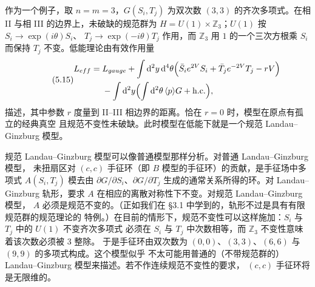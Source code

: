 作为一个例子，取 $n=m=3$，$G(S_i,T_j)$ 为双次数 $(3,3)$ 的齐次多项式。在相 II 与相 III
的边界上，未破缺的规范群为 $H=U(1)\times\mathbb{Z}_3$；$U(1)$ 按 $S_i\to\exp(i\theta)S_i$、
$T_j\to\exp(-i\theta)T_j$ 作用，而 $\mathbb{Z}_3$ 用 $1$ 的一个三次方根乘 $S_i$ 而保持 $T_j$
不变。低能理论由有效作用量
\begin{equation}
\tag{5.15}
\begin{aligned}
L_{eff}={}&L_{gauge}+\int\mathrm{d}^2y\,\mathrm{d}^4\theta
\Bigl(\bar S_ie^{2V}S_i+\bar T_je^{-2V}T_j-rV\Bigr)\\
&-\int\mathrm{d}^2y\Bigl(\int\mathrm{d}^2\theta\,\langle p\rangle G+\mathrm{h.c.}\Bigr),
\end{aligned}
\end{equation}
描述，其中参数 $r$ 度量到 II--III 相边界的距离。恰在 $r=0$ 时，模型在原点有孤立的经典真空
且规范不变性未破缺。此时模型在低能下就是一个规范 Landau--Ginzburg 模型。

规范 Landau--Ginzburg 模型可以像普通模型那样分析。对普通 Landau--Ginzburg 模型，
未扭扇区对 $(c,c)$ 手征环（即 $B$ 模型的手征环）的贡献，是手征场中多项式 $A(S_i,T_j)$
模去由 $\partial G/\partial S_i$、$\partial G/\partial T_j$ 生成的通常关系所得的环。对
Landau--Ginzburg 轨形，要求 $A$ 在相应的离散对称性下不变。对规范 Landau--Ginzburg 模型，
$A$ 必须是规范不变的。（正如我们在 §3.1 中学到的，轨形不过是具有有限规范群的规范理论的
特例。）在目前的情形下，规范不变性可以这样施加：$S_i$ 与 $T_j$ 中的 $U(1)$ 不变齐次多项式
必须在 $S_i$ 与 $T_j$ 中次数相等，而 $\mathbb{Z}_3$ 不变性意味着该次数必须被 3 整除。
于是手征环由双次数为 $(0,0)$、$(3,3)$、$(6,6)$ 与 $(9,9)$ 的多项式构成。这个模型似乎
不太可能用普通的（不带规范群的）Landau--Ginzburg 模型来描述。若不作连续规范不变性的要求，
$(c,c)$ 手征环将是无限维的。

